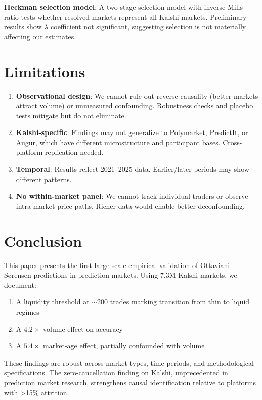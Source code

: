 \documentclass[a4paper,11pt]{article}
\theoremstyle{plain}
\theoremstyle{definition}
\begin{document}
\textbf{Heckman selection model}: A two-stage selection model with inverse Mills ratio tests whether resolved markets represent all Kalshi markets. Preliminary results show $\lambda$ coefficient not significant, suggesting selection is not materially affecting our estimates.

\section{Limitations}
\label{sec:limitations}

\begin{enumerate}
\item \textbf{Observational design}: We cannot rule out reverse causality (better markets attract volume) or unmeasured confounding. Robustness checks and placebo tests mitigate but do not eliminate.

\item \textbf{Kalshi-specific}: Findings may not generalize to Polymarket, PredictIt, or Augur, which have different microstructure and participant bases. Cross-platform replication needed.

\item \textbf{Temporal}: Results reflect 2021--2025 data. Earlier/later periods may show different patterns.

\item \textbf{No within-market panel}: We cannot track individual traders or observe intra-market price paths. Richer data would enable better deconfounding.
\end{enumerate}

\section{Conclusion}
\label{sec:conclusion}

This paper presents the first large-scale empirical validation of Ottaviani-Sørensen predictions in prediction markets. Using 7.3M Kalshi markets, we document:

\begin{enumerate}
\item A liquidity threshold at $\sim$200 trades marking transition from thin to liquid regimes
\item A $4.2\times$ volume effect on accuracy
\item A $5.4\times$ market-age effect, partially confounded with volume
\end{enumerate}

These findings are robust across market types, time periods, and methodological specifications. The zero-cancellation finding on Kalshi, unprecedented in prediction market research, strengthens causal identification relative to platforms with >15\% attrition.
\end{document}
